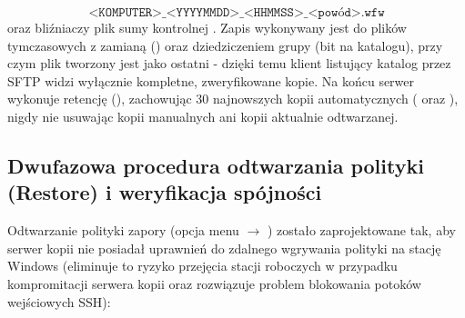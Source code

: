 \begin{enumerate}
    \[
        \texttt{<KOMPUTER>\_<YYYYMMDD>\_<HHMMSS>\_<powód>.wfw}
    \]
    oraz bliźniaczy plik sumy kontrolnej . Zapis wykonywany jest do plików tymczasowych  z zamianą () oraz dziedziczeniem grupy  (bit   na katalogu), przy czym plik  tworzony jest jako ostatni - dzięki temu klient listujący katalog przez SFTP widzi wyłącznie kompletne, zweryfikowane kopie. Na końcu serwer wykonuje retencję (), zachowując 30 najnowszych kopii automatycznych ( oraz ), nigdy nie usuwając kopii manualnych ani kopii aktualnie odtwarzanej.
\end{enumerate}

\subsection{Dwufazowa procedura odtwarzania polityki (Restore) i weryfikacja spójności}\label{subsec:import-konfiguracji}

Odtwarzanie polityki zapory (opcja menu  $\rightarrow$ \code{[R]}) zostało zaprojektowane tak, aby serwer kopii nie posiadał uprawnień do zdalnego wgrywania polityki na stację Windows (eliminuje to ryzyko przejęcia stacji roboczych w przypadku kompromitacji serwera kopii oraz rozwiązuje problem blokowania potoków wejściowych SSH):

